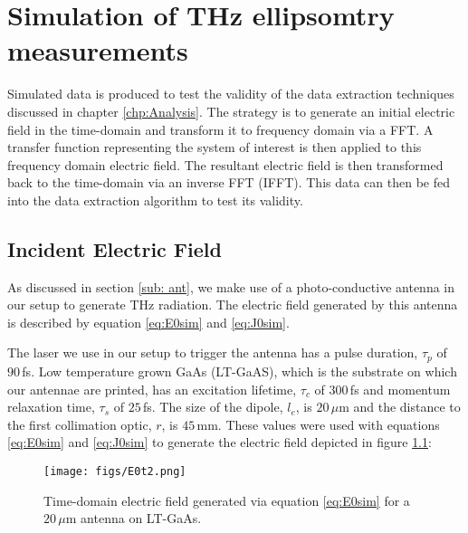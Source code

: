\chapter{Simulation of THz ellipsomtry measurements}
\label{chp:Simulation}

Simulated data is produced to test the validity of the data extraction techniques discussed in chapter \ref{chp:Analysis}. The strategy is to generate an initial electric field in the time-domain and transform it to frequency domain via a FFT. A transfer function representing the system of interest is then applied to this frequency domain electric field. The resultant electric field is then transformed back to the time-domain via an inverse FFT (IFFT). This data can then be fed into the data extraction algorithm to test its validity.

\section{Incident Electric Field}
\label{sec:IEF}
As discussed in section \ref{sub: ant}, we make use of a photo-conductive antenna in our setup to generate THz radiation. The electric field generated by this antenna is described by equation \ref{eq:E0sim} and \ref{eq:J0sim}.

The laser we use in our setup to trigger the antenna has a pulse duration, $\tau_{p}$ of $90\,$fs. Low temperature grown GaAs (LT-GaAS), which is the substrate on which our antennae are printed, has an excitation lifetime, $\tau_{c}$ of $300\,$fs and momentum relaxation time, $\tau_{s}$ of $25\,$fs.\cite{Sakai-2005} The size of the dipole, $l_{e}$, is $20\,\mu$m and the distance to the first collimation optic, $r$, is $45\,$mm. These values were used with equations \ref{eq:E0sim} and \ref{eq:J0sim} to generate the electric field depicted in figure \ref{fig:E0t}:

\begin{figure}[H]
\begin{center}
\texttt{[image: figs/E0t2.png]}
\end{center}
\caption{\label{fig:E0t} Time-domain electric field generated via equation \ref{eq:E0sim} for a $20\,\mu$m antenna on LT-GaAs.}
\end{figure}

